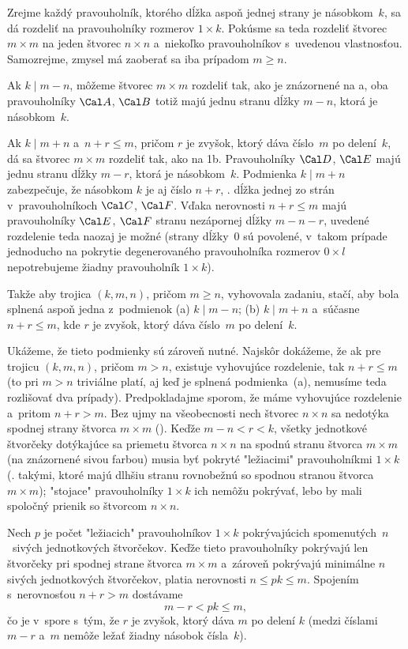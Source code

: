 {%
Zrejme každý pravouholník, ktorého dĺžka aspoň jednej strany je násobkom~$k$, sa dá rozdeliť na pravouholníky rozmerov $1\times k$. Pokúsme sa teda rozdeliť štvorec $m\times m$ na jeden štvorec $n\times n$ a~niekoľko pravouholníkov s~uvedenou vlastnosťou. Samozrejme, zmysel má zaoberať sa iba prípadom $m\ge n$.
%

Ak $k\mid m-n$, môžeme štvorec $m\times m$ rozdeliť tak, ako je znázornené na \obr{}a, oba pravouholníky $\Cal A$, $\Cal B$ totiž majú jednu stranu dĺžky $m-n$, ktorá je násobkom~$k$.

Ak $k\mid m+n$ a~$n+r\le m$, pričom $r$ je zvyšok, ktorý dáva číslo~$m$ po delení~$k$, dá sa štvorec $m\times m$ rozdeliť tak, ako na \obrr1b. Pravouholníky $\Cal D$, $\Cal E$ majú jednu stranu dĺžky $m-r$, ktorá je násobkom~$k$. Podmienka $k\mid m+n$ zabezpečuje, že násobkom $k$ je aj číslo $n+r$, \tj. dĺžka jednej zo strán v~pravouholníkoch $\Cal C$, $\Cal F$. Vďaka nerovnosti $n+r\le m$ majú pravouholníky $\Cal E$, $\Cal F$ stranu nezápornej dĺžky $m-n-r$, uvedené rozdelenie teda naozaj je možné (strany dĺžky~$0$ sú povolené, v~takom prípade jednoducho na pokrytie degenerovaného pravouholníka rozmerov $0\times l$ nepotrebujeme žiadny pravouholník $1\times k$).

Takže aby trojica $(k,m,n)$, pričom $m\ge n$, vyhovovala zadaniu, stačí, aby bola splnená aspoň jedna z~podmienok
\ite (a) $k\mid m-n$;
\ite (b) $k\mid m+n$ a~súčasne $n+r\le m$, kde $r$ je zvyšok, ktorý dáva číslo~$m$ po delení~$k$.

\smallskip
Ukážeme, že tieto podmienky sú zároveň nutné. Najskôr dokážeme, že ak pre trojicu $(k,m,n)$, pričom $m>n$, existuje vyhovujúce rozdelenie, tak $n+r\le m$ (to pri $m>n$ triviálne platí, aj keď je splnená podmienka~(a), nemusíme teda rozlišovať dva prípady). Predpokladajme sporom, že máme vyhovujúce rozdelenie a~pritom $n+r>m$. Bez ujmy na všeobecnosti nech štvorec $n\times n$ sa nedotýka spodnej strany štvorca $m\times m$ (\obr). Keďže $m-n<r<k$, všetky jednotkové štvorčeky dotýkajúce sa priemetu štvorca $n\times n$ na spodnú stranu štvorca $m\times m$ (na  znázornené sivou farbou) musia byť pokryté "ležiacimi" pravouholníkmi $1\times k$ (\tj. takými, ktoré majú dlhšiu stranu rovnobežnú so spodnou stranou štvorca $m\times m$); "stojace" pravouholníky $1\times k$ ich nemôžu pokrývať, lebo by mali spoločný prienik so štvorcom $n\times n$.
%

Nech $p$ je počet "ležiacich" pravouholníkov $1\times k$ pokrývajúcich spomenutých~$n$~sivých jednotkových štvorčekov. Keďže tieto pravouholníky pokrývajú len štvorčeky pri spodnej strane štvorca $m\times m$ a~zároveň pokrývajú minimálne $n$ sivých jednotkových štvorčekov, platia nerovnosti $n\le pk\le m$. Spojením s~nerovnosťou $n+r>m$ dostávame
$$
m-r<pk\le m,
$$
čo je v~spore s~tým, že $r$ je zvyšok, ktorý dáva $m$ po delení $k$ (medzi číslami $m-r$ a~$m$ nemôže ležať žiadny násobok čísla~$k$).

}
